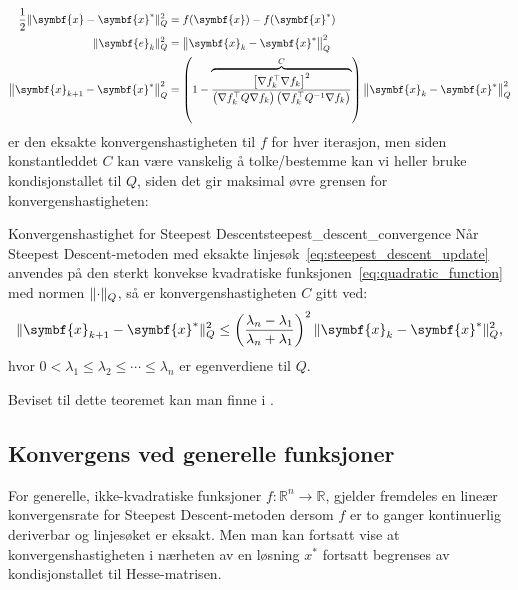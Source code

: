 \begin{align*}
	\frac{1}{2} \norm{\symbf{x} - \symbf{x}^\ast}_Q^2 & = f(\symbf{x}) - f(\symbf{x}^\ast)                                                                                                                                                                                    \\
	\norm{\symbf{e}_k}_Q^2                            & = \norm*{\symbf{x}_k - \symbf{x}^\ast}_Q^2                                                                                                                                                                            \\
	\norm*{\symbf{x}_{k+1} - \symbf{x}^\ast}_Q^2      & = \left(1 - \overbrace{\frac{\left[\nabla f_k^\top \nabla f_k\right]^2}{\left(\nabla f_k^\top Q \nabla f_k\right)\left(\nabla f_k^\top Q^{-1} \nabla f_k\right)}}^{C}\right) \norm*{\symbf{x}_k - \symbf{x}^\ast}_Q^2
\end{align*}
er den eksakte konvergenshastigheten til $f$ for hver iterasjon, men siden konstantleddet \(C\) kan være vanskelig å tolke/bestemme kan vi heller bruke kondisjonstallet til \(Q\), siden det gir maksimal øvre grensen for konvergenshastigheten:

\begin{theorem}{Konvergenshastighet for Steepest Descent}{steepest_descent_convergence}
	Når Steepest Descent-metoden med eksakte linjesøk~\eqref{eq:steepest_descent_update} anvendes på den sterkt konvekse kvadratiske funksjonen~\eqref{eq:quadratic_function} med normen \(\lVert\cdot\rVert_Q\), så er konvergenshastigheten \(C\) gitt ved:
	\[
		\norm{\symbf{x}_{k+1} - \symbf{x}^\ast}_Q^2 \leq \left(\frac{\lambda_n - \lambda_1}{\lambda_n + \lambda_1}\right)^2 \norm{\symbf{x}_k - \symbf{x}^\ast}_Q^2,
	\]
	hvor \(0 < \lambda_1 \leq \lambda_2 \leq \cdots \leq \lambda_n\) er egenverdiene til \(Q\).
\end{theorem}
Beviset til dette teoremet kan man finne i \cite{luenberger1984linear}.

\subsection{Konvergens ved generelle funksjoner}
For generelle, ikke-kvadratiske funksjoner \(f : \mathbb{R}^n \to \mathbb{R}\), gjelder fremdeles en lineær konvergensrate for Steepest Descent-metoden dersom \(f\) er to ganger kontinuerlig deriverbar og linjesøket er eksakt.
Men man kan fortsatt vise at konvergenshastigheten i nærheten av en løsning \(x^\ast\) fortsatt begrenses av kondisjonstallet til Hesse-matrisen.

